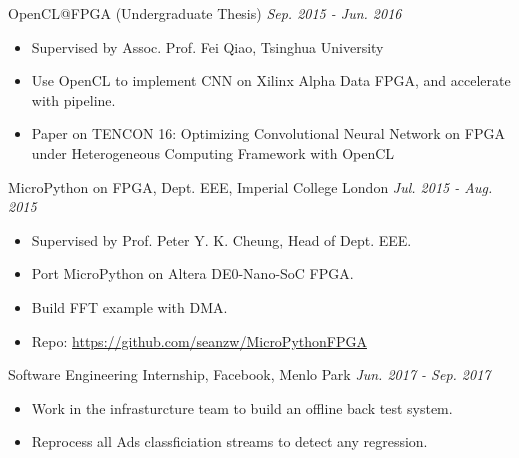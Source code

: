 \documentclass[a4paper]{article}
\newenvironment{changemargin}[2]{%
  \begin{list}{}{%
    \setlength{\topsep}{0pt}%
    \setlength{\leftmargin}{#1}%
    \setlength{\rightmargin}{#2}%
    \setlength{\listparindent}{\parindent}%
    \setlength{\itemindent}{\parindent}%
    \setlength{\parsep}{\parskip}%
  }%
  \item[]}{\end{list}
}
\newenvironment{body} {
	\vspace*{-16pt}
	\begin{changemargin}{-0.25in}{-0.5in}
  }	
	{\end{changemargin}
}
\begin{document}
\begin{body}


	OpenCL@FPGA (Undergraduate Thesis) \hfill \emph{Sep. 2015 - Jun. 2016}
	\begin{itemize}
	\itemsep 0pt
	\item Supervised by Assoc. Prof. Fei Qiao, Tsinghua University
	\item Use OpenCL to implement CNN on Xilinx Alpha Data FPGA, and accelerate with pipeline.
	\item Paper on TENCON 16: Optimizing Convolutional Neural Network on FPGA under Heterogeneous Computing Framework with OpenCL
	\end{itemize}
	\smallskip


	MicroPython on FPGA, Dept. EEE, Imperial College London \hfill \emph{Jul. 2015 - Aug. 2015}
	\begin{itemize}
	\itemsep 0pt
	\item Supervised by Prof. Peter Y. K. Cheung, Head of Dept. EEE.
	\item Port MicroPython on Altera DE0-Nano-SoC FPGA.
	\item Build FFT example with DMA.
	\item Repo: \href{https://github.com/seanzw/MicroPythonFPGA}{https://github.com/seanzw/MicroPythonFPGA}
	\end{itemize}
	\smallskip

	Software Engineering Internship, Facebook, Menlo Park \hfill \emph{Jun. 2017 - Sep. 2017}
	\begin{itemize}
	\itemsep 0pt
	\item Work in the infrasturcture team to build an offline back test system.
	\item Reprocess all Ads classficiation streams to detect any regression.
	\end{itemize}
	\smallskip


\end{body}
\end{document}
